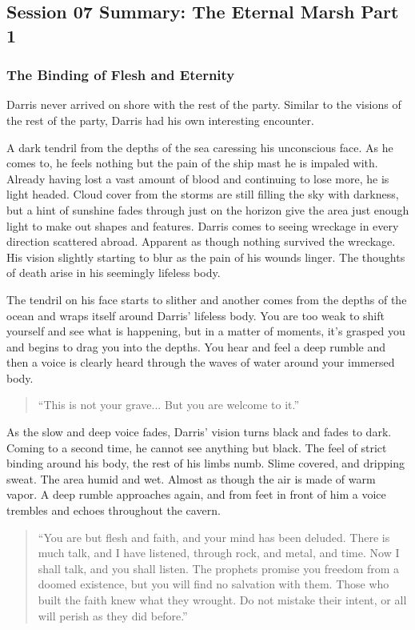 \subsection{Session 07 Summary: The Eternal Marsh Part 1}

\subsubsection{The Binding of Flesh and Eternity}

Darris never arrived on shore with the rest of the party. Similar to the visions of the rest of the party, Darris had his own interesting encounter.

A dark tendril from the depths of the sea caressing his unconscious face. As he comes to, he feels nothing but the pain of the ship mast he is impaled with. Already having lost a vast amount of blood and continuing to lose more, he is light headed. Cloud cover from the storms are still filling the sky with darkness, but a hint of sunshine fades through just on the horizon give the area just enough light to make out shapes and features. Darris comes to seeing wreckage in every direction scattered abroad. Apparent as though nothing survived the wreckage. His vision slightly starting to blur as the pain of his wounds linger. The thoughts of death arise in his seemingly lifeless body.

The tendril on his face starts to slither and another comes from the depths of the ocean and wraps itself around Darris' lifeless body. You are too weak to shift yourself and see what is happening, but in a matter of moments, it's grasped you and begins to drag you into the depths. You hear and feel a deep rumble and then a voice is clearly heard through the waves of water around your immersed body.

\begin{quote}
	``This is not your grave... But you are welcome to it.''
\end{quote}

As the slow and deep voice fades, Darris' vision turns black and fades to dark. Coming to a second time, he cannot see anything but black. The feel of strict binding around his body, the rest of his limbs numb. Slime covered, and dripping sweat. The area humid and wet. Almost as though the air is made of warm vapor. A deep rumble approaches again, and from feet in front of him a voice trembles and echoes throughout the cavern. 

\begin{quote}
	``You are but flesh and faith, and your mind has been deluded. There is much talk, and I have listened, through rock, and metal, and time. Now I shall talk, and you shall listen. The prophets promise you freedom from a doomed existence, but you will find no salvation with them. Those who built the faith knew what they wrought. Do not mistake their intent, or all will perish as they did before.''
\end{quote}
	
